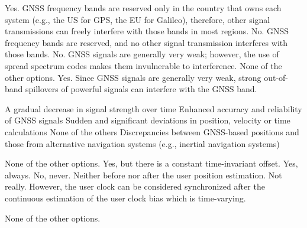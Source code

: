 \begin{questions}

    \begin{checkboxes}
        \choice Yes. GNSS frequency bands are reserved only in the country that owns each system (e.g., the US for GPS, the EU for Galileo), therefore, other signal transmissions can freely interfere with those bands in most regions.
        \choice No. GNSS frequency bands are reserved, and no other signal transmission interferes with those bands.
        \choice No. GNSS signals are generally very weak; however, the use of spread spectrum codes makes them invulnerable to interference.
        \choice None of the other options.
        \CorrectChoice Yes. Since GNSS signals are generally very weak, strong out-of-band spillovers of powerful signals can interfere with the GNSS band.
    \end{checkboxes}

    \begin{checkboxes}
        \choice A gradual decrease in signal strength over time
        \choice Enhanced accuracy and reliability of GNSS signals
        \choice Sudden and significant deviations in position, velocity or time calculations
        \choice None of the others
        \choice Discrepancies between GNSS-based positions and those from alternative navigation systems (e.g., inertial navigation systems)
    \end{checkboxes}


    \begin{checkboxes}
        \choice None of the other options.
        \choice Yes, but there is a constant time-invariant offset.
        \choice Yes, always.
        \choice No, never. Neither before nor after the user position estimation.
        \CorrectChoice Not really. However, the user clock can be considered synchronized after the
        continuous estimation of the user clock bias which is time-varying.
    \end{checkboxes}

    \begin{checkboxes}
        \choice None of the other options.
    \end{checkboxes}



\end{questions}
